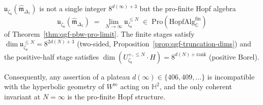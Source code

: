 \begin{theorem}
\begin{enumerate}[label=\textup{(\roman*)}]
 $\mathfrak u_{\zeta_8}(\widehat{\mathfrak m}_{\Delta_5})$ is not
 a single integer $8^{d(\infty)+3}$ but the pro-finite Hopf
 algebra
 \[
 \mathfrak u_{\zeta_8}(\widehat{\mathfrak m}_{\Delta_5})
 \;=\;
 \lim_{N\to\infty}\mathfrak u_{\zeta_8}^{\le N}
 \;\in\;\mathrm{Pro}(\mathrm{HopfAlg}^{\mathrm{fin}}_{\mathbb C})
 \]
 of Theorem~\ref{thm:qgf-pbw-pro-limit}. The finite stages
 satisfy $\dim\mathfrak u_{\zeta_8}^{\le N}=8^{2d(N)+3}$
 (two-sided, Proposition~\ref{prop:qgf-truncation-dims}) and the
 positive-half stage satisfies
 $\dim(U^{+,\le N}_{\zeta_8}\cdot H)=8^{d(N)+\mathrm{rank}}$
 (positive Borel).
\end{enumerate}
Consequently, any assertion of a plateau
$d(\infty)\in\{406,409,\ldots\}$ is incompatible with the hyperbolic
geometry of $W^{\mathrm{re}}$ acting on $\mathbb H^2$, and the only
coherent invariant at $N=\infty$ is the pro-finite Hopf structure.
\end{theorem}

